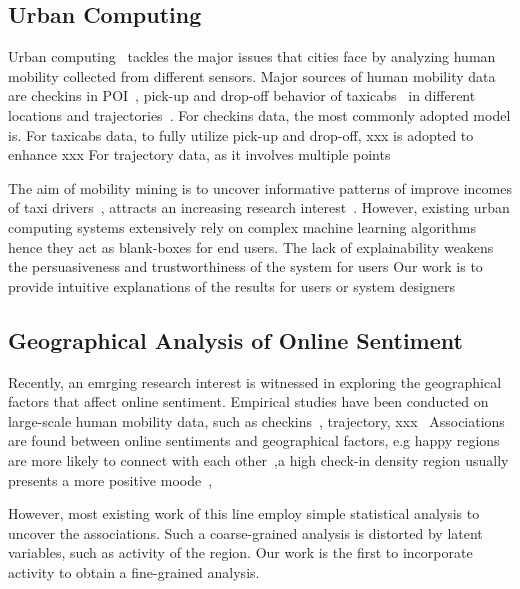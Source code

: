 \documentclass[runningheads]{llncs}
\begin{document}
\subsection{Urban Computing}

Urban computing~\cite{Zheng2014UrbanConcepts} tackles the major issues that cities face by analyzing human mobility collected from different sensors.  
Major sources of human mobility data are checkins in POI~\cite{}, pick-up and drop-off behavior of taxicabs~\cite{} in different locations and  trajectories~\cite{}.
For checkins data, the most commonly adopted model is.
For taxicabs data, to fully utilize pick-up and drop-off, xxx is adopted to enhance xxx
For trajectory data, as it involves multiple points 

The aim of mobility mining is to uncover informative patterns of improve incomes of taxi drivers~\cite{}, attracts an increasing research interest~\cite{}. 
However, existing urban computing systems extensively rely on complex machine learning algorithms hence they act as blank-boxes for end users. 
The lack of explainability weakens the persuasiveness and trustworthiness of the system for users
Our work is to provide intuitive explanations of the results for users or system designers



\subsection{Geographical Analysis of Online Sentiment}

Recently, an emrging research interest is witnessed in exploring the geographical factors that affect online sentiment.
Empirical studies have been conducted on large-scale human mobility data, such as checkins~\cite{}, trajectory, xxx~\cite{}
Associations are found between online sentiments and geographical factors, e.g happy regions are more likely to connect with each other~\cite{milan15},a high check-in density region usually presents a more positive moode~\cite{}, 

However, most existing work of this line employ simple statistical analysis to uncover the associations. 
Such a coarse-grained analysis is distorted by latent variables, such as activity of the region.
Our work is the first to incorporate activity to obtain a fine-grained analysis.
\end{document}
